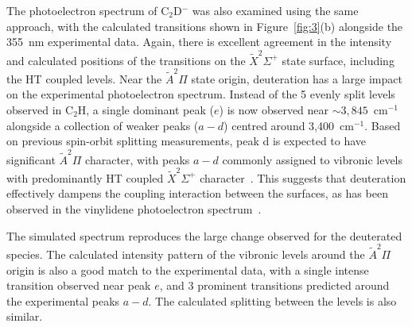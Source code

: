 \documentclass[journal=jpcafh,manuscript=article,layout=onecolumn, 12pt]{achemso}
\begin{document}
The photoelectron spectrum of C$_2$D$^-$ was also examined using the same approach, with the calculated transitions shown in Figure~\ref{fig:3}(b) alongside the 355~nm experimental data. Again, there is excellent agreement in the intensity and calculated positions of the transitions on the $\tilde{X} ^2\Sigma^+$ state surface, including the HT coupled levels. Near the $\tilde{A} ^2\Pi$ state origin, deuteration has a large impact on the experimental photoelectron spectrum. Instead of the 5 evenly split levels observed in C$_2$H, a single dominant peak ($e$) is now observed near $\sim3,845$~cm$^{-1}$ alongside a collection of weaker peaks ($a-d$) centred around 3,400~cm$^{-1}$. Based on previous spin-orbit splitting measurements, peak d is expected to have significant $\tilde{A} ^2\Pi$ character, with peaks $a-d$ commonly assigned to vibronic levels with predominantly HT coupled $\tilde{X} ^2\Sigma^+$ character~\cite{yan87,hsu95,chi99,wil11}. This suggests that deuteration effectively dampens the coupling interaction between the surfaces, as has been observed in the vinylidene photoelectron spectrum~\cite{dev17}.

The simulated spectrum reproduces the large change observed for the deuterated species. The calculated intensity pattern of the vibronic levels around the $\tilde{A} ^2\Pi$ origin is also a good match to the experimental data, with a single intense transition observed near peak $e$, and 3 prominent transitions predicted around the experimental peaks $a-d$. The calculated splitting between the levels is also similar. %
\end{document}
